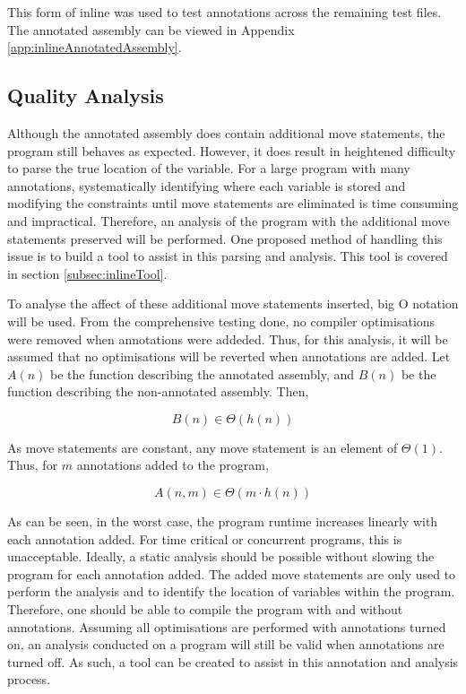 This form of inline  was used to test annotations across the remaining test files. The annotated assembly can be viewed in Appendix \ref{app:inlineAnnotatedAssembly}.

\subsection{Quality Analysis}

Although the annotated assembly does contain additional move statements, the program still behaves as expected. However, it does result in heightened difficulty to parse the true location of the variable. For a large program with many annotations, systematically identifying where each variable is stored and modifying the constraints until move statements are eliminated is time consuming and impractical. Therefore, an analysis of the program with the additional move statements preserved will be performed. One proposed method of handling this issue is to build a tool to assist in this parsing and analysis. This tool is covered in section \ref{subsec:inlineTool}.

To analyse the affect of these additional move statements inserted, big O notation will be used. From the comprehensive testing done, no compiler optimisations were removed when annotations were addeded. Thus, for this analysis, it will be assumed that no optimisations will be reverted when annotations are added. Let \(A(n)\) be the function describing the annotated assembly, and \(B(n)\) be the function describing the non-annotated assembly. Then,

\[B(n) \in \Theta(h(n))\]

As move statements are constant, any move statement is an element of \(\Theta(1)\). Thus, for \(m\) annotations added to the program, 

\[A(n, m) \in \Theta(m \cdot h(n))\]

As can be seen, in the worst case, the program runtime increases linearly with each annotation added. For time critical or concurrent programs, this is unacceptable. Ideally, a static analysis should be possible without slowing the program for each annotation added. The added move statements are only used to perform the analysis and to identify the location of variables within the program. Therefore, one should be able to compile the program with and without annotations. Assuming all optimisations are performed with annotations turned on, an analysis conducted on a program will still be valid when annotations are turned off. As such, a tool can be created to assist in this annotation and analysis process.


